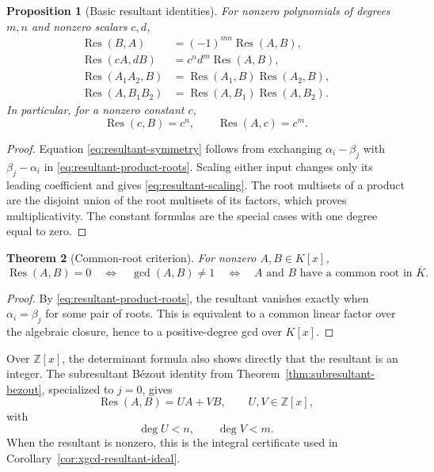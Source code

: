 \documentclass[11pt]{book}
\newtheorem{theorem}{Theorem}[section]
\newtheorem{proposition}[theorem]{Proposition}
\theoremstyle{definition}
\newcommand{\ZZ}{\mathbb Z}
\begin{document}
\begin{proposition}[Basic resultant identities]\label{prop:resultant-basic}
For nonzero polynomials of degrees $m,n$ and nonzero scalars $c,d$,
\begin{align}
 \operatorname{Res}(B,A)
   &=(-1)^{mn}\operatorname{Res}(A,B),
 \label{eq:resultant-symmetry}\\
 \operatorname{Res}(cA,dB)
   &=c^n d^m\operatorname{Res}(A,B),
 \label{eq:resultant-scaling}\\
 \operatorname{Res}(A_1A_2,B)
   &=\operatorname{Res}(A_1,B)\operatorname{Res}(A_2,B),
 \label{eq:resultant-multiplicative-a}\\
 \operatorname{Res}(A,B_1B_2)
   &=\operatorname{Res}(A,B_1)\operatorname{Res}(A,B_2).
 \label{eq:resultant-multiplicative-b}
\end{align}
In particular, for a nonzero constant $c$,
\begin{equation}\label{eq:resultant-constant}
 \operatorname{Res}(c,B)=c^n,
 \qquad
 \operatorname{Res}(A,c)=c^m.
\end{equation}
\end{proposition}

\begin{proof}
Equation \eqref{eq:resultant-symmetry} follows from exchanging
$\alpha_i-\beta_j$ with $\beta_j-\alpha_i$ in
\eqref{eq:resultant-product-roots}.  Scaling either input changes only its
leading coefficient and gives \eqref{eq:resultant-scaling}.  The root
multisets of a product are the disjoint union of the root multisets of its
factors, which proves multiplicativity.  The constant formulas are the
special cases with one degree equal to zero.
\end{proof}

\begin{theorem}[Common-root criterion]\label{thm:resultant-zero-criterion}
For nonzero $A,B\in K[x]$,
\[
 \operatorname{Res}(A,B)=0
 \quad\Longleftrightarrow\quad
 \gcd(A,B)\ne1
 \quad\Longleftrightarrow\quad
 A\text{ and }B\text{ have a common root in }\overline K.
\]
\end{theorem}

\begin{proof}
By \eqref{eq:resultant-product-roots}, the resultant vanishes exactly when
$\alpha_i=\beta_j$ for some pair of roots.  This is equivalent to a common
linear factor over the algebraic closure, hence to a positive-degree gcd over
$K[x]$.
\end{proof}

Over $\ZZ[x]$, the determinant formula also shows directly that the resultant
is an integer.  The subresultant B\'ezout identity from
Theorem~\ref{thm:subresultant-bezout}, specialized to $j=0$, gives
\begin{equation}\label{eq:resultant-bezout-repeat}
 \operatorname{Res}(A,B)=UA+VB,
 \qquad U,V\in\ZZ[x],
\end{equation}
with
\[
 \deg U<n,
 \qquad
 \deg V<m.
\]
When the resultant is nonzero, this is the integral certificate used in
Corollary~\ref{cor:xgcd-resultant-ideal}.
\end{document}
